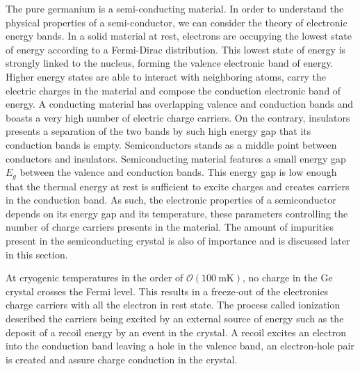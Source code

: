 The pure germanium is a semi-conducting material. In order to understand the physical properties of a semi-conductor, we can consider the theory of electronic energy bands. In a solid material at rest, electrons are occupying the lowest state of energy according to a Fermi-Dirac distribution. This lowest state of energy is strongly linked to the nucleus, forming the valence electronic band of energy. Higher energy states are able to interact with neighboring atoms, carry the electric charges in the material and compose the conduction electronic band of energy. A conducting material has overlapping valence and conduction bands and boasts a very high number of electric charge carriers. On the contrary, insulators presents a separation of the two bands by such high energy gap that its conduction bands is empty. Semiconductors stands as a middle point between conductors and insulators. Semiconducting material features a small energy gap $E_g$ between the valence and conduction bands. This energy gap is low enough that the thermal energy at rest is sufficient to excite charges and creates carriers in the conduction band. As such, the electronic properties of a semiconductor depends on its energy gap and its temperature, these parameters controlling the number of charge carriers presents in the material. The amount of impurities present in the semiconducting crystal is also of importance and is discussed later in this section.


At cryogenic temperatures in the order of $\mathcal{O}(\SI{100}{\milli\kelvin})$, no charge in the Ge crystal crosses the Fermi level. This results in a freeze-out of the electronics charge carriers with all the electron in rest state. The process called ionization described the carriers being excited by an external source of energy such as the deposit of a recoil energy by an event in the crystal. A recoil excites an electron into the conduction band leaving a hole in the valence band, an electron-hole pair is created and assure charge conduction in the crystal.

